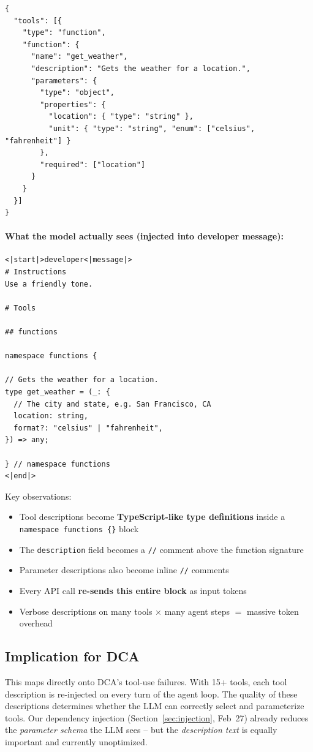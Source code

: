 \begin{verbatim}
{
  "tools": [{
    "type": "function",
    "function": {
      "name": "get_weather",
      "description": "Gets the weather for a location.",
      "parameters": {
        "type": "object",
        "properties": {
          "location": { "type": "string" },
          "unit": { "type": "string", "enum": ["celsius", "fahrenheit"] }
        },
        "required": ["location"]
      }
    }
  }]
}
\end{verbatim}

\paragraph{What the model actually sees (injected into developer message):}

\begin{verbatim}
<|start|>developer<|message|>
# Instructions
Use a friendly tone.

# Tools

## functions

namespace functions {

// Gets the weather for a location.
type get_weather = (_: {
  // The city and state, e.g. San Francisco, CA
  location: string,
  format?: "celsius" | "fahrenheit",
}) => any;

} // namespace functions
<|end|>
\end{verbatim}

\noindent Key observations:
\begin{itemize}
    \item Tool descriptions become \textbf{TypeScript-like type definitions} inside a \texttt{namespace functions \{\}} block
    \item The \texttt{description} field becomes a \texttt{//} comment above the function signature
    \item Parameter descriptions also become inline \texttt{//} comments
    \item Every API call \textbf{re-sends this entire block} as input tokens
    \item Verbose descriptions on many tools $\times$ many agent steps $=$ massive token overhead
\end{itemize}

\subsection{Implication for DCA}

This maps directly onto DCA's tool-use failures.
With 15+ tools, each tool description is re-injected on every turn of the agent loop.
The quality of these descriptions determines whether the LLM can correctly select and parameterize tools.
Our dependency injection (Section~\ref{sec:injection}, Feb~27) already reduces the \emph{parameter schema} the LLM sees -- but the \emph{description text} is equally important and currently unoptimized.


